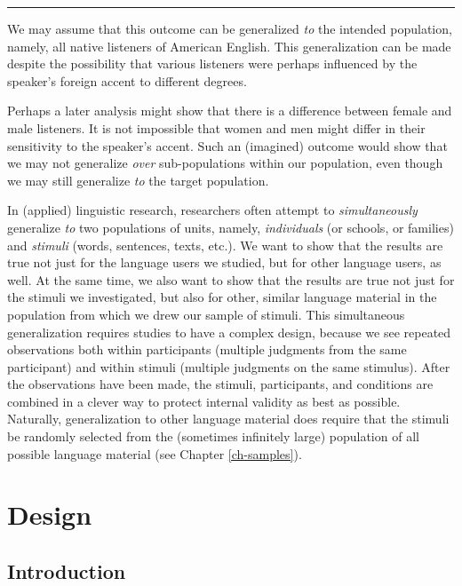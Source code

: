 \documentclass[
]{book}
\begin{document}
\begin{center}\rule{0.5\linewidth}{0.5pt}\end{center}

We may assume that this outcome can be generalized \emph{to} the intended population, namely, all native listeners of American English. This generalization can be made despite the possibility that various listeners were perhaps influenced by the speaker's foreign accent to different degrees.

Perhaps a later analysis might show that there is a difference between female and male listeners. It is not impossible that women and men might differ in their sensitivity to the speaker's accent. Such an (imagined) outcome would show that we may not generalize \emph{over} sub-populations within our population, even though we may still generalize \emph{to} the target population.

In (applied) linguistic research, researchers often attempt to \emph{simultaneously} generalize \emph{to} two populations of units, namely, \emph{individuals} (or schools, or families) and \emph{stimuli} (words, sentences, texts, etc.). We want to show that the results are true not just for the language users we studied, but for other language users, as well. At the same time, we also want to show that the results are true not just for the stimuli we investigated, but also for other, similar language material in the population from which we drew our sample of stimuli. This simultaneous generalization requires studies to have a complex design, because we see repeated observations both within participants (multiple judgments from the same participant) and within stimuli (multiple judgments on the same stimulus). After the observations have been made, the stimuli, participants, and conditions are combined in a clever way to protect internal validity as best as possible. Naturally, generalization to other language material does require that the stimuli be randomly selected from the (sometimes infinitely large) population of all possible language material (see Chapter \ref{ch-samples}).

\chapter{Design}\label{ch-design}

\section{Introduction}\label{sec:design-introduction}
\end{document}

